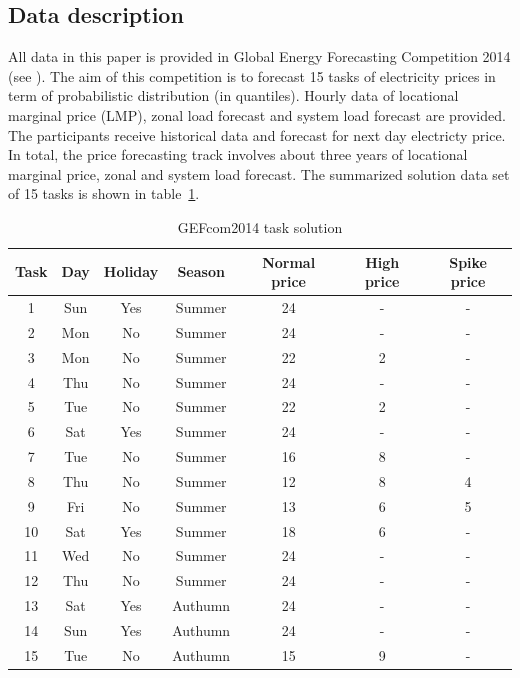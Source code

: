 \documentclass[review]{elsarticle}
\begin{document}
  \subsection{Data description}
    All data in this paper is provided in Global Energy Forecasting Competition 2014 (see \cite{Hong2016}). The aim of this competition is to forecast 15 tasks of electricity prices in term of probabilistic distribution (in quantiles). Hourly data of locational marginal price (LMP), zonal load forecast and system load forecast are provided. The participants receive historical data and forecast for next day electricty price. In total, the price forecasting track involves about three years of locational marginal price, zonal and system load forecast. The summarized solution data set of 15 tasks is shown in table~\ref{table:price_data_set}.
    \begin{table}[H]
      \begin{center}
      \caption{GEFcom2014 task solution}
      \begin{adjustbox}{width=\textwidth}
        \begin{tabular}{|c|c|c|c|c|c|c|}
          \hline
          Task & Day & Holiday & Season & Normal price & High price & Spike price\\
          \hline
          1 & Sun & Yes & Summer & 24 & - & -\\
          2 & Mon & No & Summer & 24 & - & -\\
          3 & Mon & No & Summer & 22 & 2 & -\\
          4 & Thu & No & Summer & 24 & - & -\\
          5 & Tue & No & Summer & 22 & 2 & -\\
          6 & Sat & Yes & Summer & 24 & - & -\\
          7 & Tue & No & Summer & 16 & 8 & -\\
          8 & Thu & No & Summer & 12 & 8 & 4\\
          9 & Fri & No & Summer & 13 & 6 & 5\\
          10 & Sat & Yes & Summer & 18 & 6 & -\\
          11 & Wed & No & Summer & 24 & - & -\\
          12 & Thu & No & Summer & 24 & - & -\\
          13 & Sat & Yes & Authumn & 24 & - & -\\
          14 & Sun & Yes & Authumn & 24 & - & -\\
          15 & Tue & No & Authumn & 15 & 9 & -\\
          \hline
        \end{tabular}
      \end{adjustbox}
      \label{table:price_data_set}
      \end{center}
    \end{table}
\end{document}
